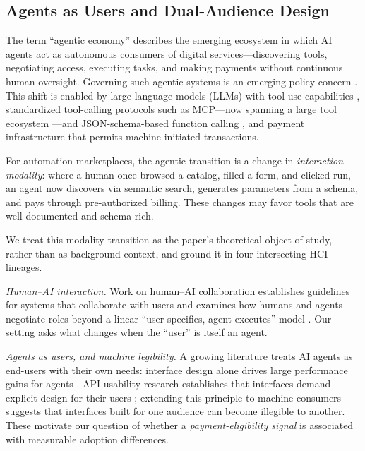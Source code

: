 \subsection{Agents as Users and Dual-Audience Design}
\label{sec:rw:agentic}

The term ``agentic economy'' describes the emerging ecosystem in which AI
agents act as autonomous consumers of digital services---discovering tools,
negotiating access, executing tasks, and making payments without continuous
human oversight. Governing such agentic systems is an emerging policy concern
\cite{shavit2023practices}. This shift is enabled by large
language models (LLMs) with tool-use capabilities
\cite{schick2023toolformer,qin2024toolllm}, standardized tool-calling protocols
such as MCP---now spanning a large tool ecosystem
\cite{stein2026mcpecosystem}---and JSON-schema-based function calling
\cite{openai2024function}, and payment infrastructure that permits
machine-initiated transactions.

For automation marketplaces, the agentic transition is a change in
\emph{interaction modality}: where a human once browsed a catalog, filled a
form, and clicked run, an agent now discovers via semantic search, generates
parameters from a schema, and pays through pre-authorized billing. These
changes may favor tools that are well-documented and schema-rich.

We treat this modality transition as the paper's theoretical object of study,
rather than as background context, and ground it in four intersecting HCI
lineages.

\emph{Human--AI interaction.} Work on human--AI collaboration establishes
guidelines for systems that collaborate with users \cite{amershi2019guidelines}
and examines how humans and agents negotiate roles beyond a linear
``user specifies, agent executes'' model \cite{zhou2024nonlinear}. Our setting
asks what changes when the ``user'' is itself an agent.

\emph{Agents as users, and machine legibility.} A growing literature treats AI
agents as end-users with their own needs: interface design alone drives large
performance gains for agents \cite{yang2024sweagent}. API usability research
establishes that interfaces demand explicit design for their users
\cite{myers2016api}; extending this principle to machine consumers suggests
that interfaces built for one audience can become illegible to another. These
motivate our question of whether a \emph{payment-eligibility signal} is
associated with measurable adoption differences.

